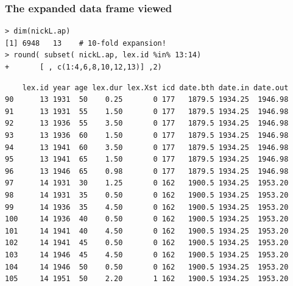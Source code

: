 \documentclass[handout,12pt]{beamer}
\begin{document}
\begin{frame} [fragile]
\frametitle{The expanded data frame viewed}
\small
\renewcommand{\baselinestretch}{0.9}  
\begin{verbatim}
> dim(nickL.ap)
[1] 6948   13    # 10-fold expansion!
> round( subset( nickL.ap, lex.id %in% 13:14)
+       [ , c(1:4,6,8,10,12,13)] ,2)
\end{verbatim}
\scriptsize
\begin{verbatim} 
    lex.id year age lex.dur lex.Xst icd date.bth date.in date.out
90      13 1931  50    0.25       0 177   1879.5 1934.25  1946.98
91      13 1931  55    1.50       0 177   1879.5 1934.25  1946.98
92      13 1936  55    3.50       0 177   1879.5 1934.25  1946.98
93      13 1936  60    1.50       0 177   1879.5 1934.25  1946.98
94      13 1941  60    3.50       0 177   1879.5 1934.25  1946.98
95      13 1941  65    1.50       0 177   1879.5 1934.25  1946.98
96      13 1946  65    0.98       0 177   1879.5 1934.25  1946.98
97      14 1931  30    1.25       0 162   1900.5 1934.25  1953.20
98      14 1931  35    0.50       0 162   1900.5 1934.25  1953.20
99      14 1936  35    4.50       0 162   1900.5 1934.25  1953.20
100     14 1936  40    0.50       0 162   1900.5 1934.25  1953.20
101     14 1941  40    4.50       0 162   1900.5 1934.25  1953.20
102     14 1941  45    0.50       0 162   1900.5 1934.25  1953.20
103     14 1946  45    4.50       0 162   1900.5 1934.25  1953.20
104     14 1946  50    0.50       0 162   1900.5 1934.25  1953.20
105     14 1951  50    2.20       1 162   1900.5 1934.25  1953.20
\end{verbatim}  
\renewcommand{\baselinestretch}{1.0} 
\normalsize

\end{frame}
\end{document}
